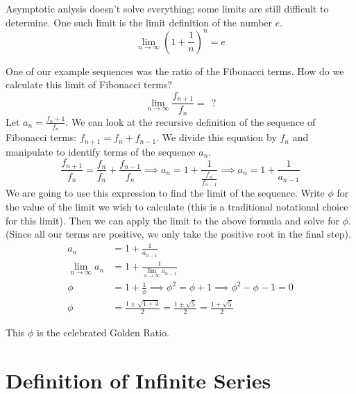 \documentclass[fleqn]{report}
\begin{document}
\begin{example}Asymptotic anlysis doesn't solve everything;
some limits are still difficult to determine. 
One such limit is the limit definition of the number $e$.
\begin{equation*}
\lim_{n \rightarrow \infty} \left( 1 + \frac{1}{n} \right)^n = e 
\end{equation*}
\end{example}

\begin{example}One of our example sequences was the ratio of
the Fibonacci terms. How do we calculate this limit of
Fibonacci terms?
\begin{equation*}
\lim_{n \rightarrow \infty} \frac{f_{n+1}}{f_n} = \ \ ?
\end{equation*}
Let $a_n = \frac{f_n+1}{f_n}$. We can look at the recursive
definition of the sequence of Fibonacci terms: $f_{n+1} = f_{n}
+ f_{n-1}$. We divide this equation by $f_n$ and manipulate to
identify terms of the sequence $a_n$. 
\begin{equation*}
\frac{f_{n+1}}{f_n} = \frac{f_n}{f_n} + \frac{f_{n-1}}{f_n}
\implies 
a_n = 1 + \frac{1}{\frac{f_n}{f_{n-1}}} \implies
a_n = 1 + \frac{1}{a_{n-1}}
\end{equation*}
We are going to use this expression to find the limit of the
sequence. Write $\phi$ for the value of the limit we wish to calculate
(this is a traditional notational choice for this limit). Then
we can apply the limit to the above formula and solve for
$\phi$. (Since all our terms are
positive, we only take the positive root in the final step).
\begin{align*}
a_n & = 1 + \frac{1}{a_{n-1}} \\
\lim_{n \rightarrow \infty} a_n & = 1 + 
\frac{1}{\lim_{n \rightarrow \infty} a_{n-1}} \\
\phi & = 1 + \frac{1}{\phi} \implies 
\phi^2 = \phi + 1 \implies
\phi^2 - \phi - 1 = 0 \\
\phi & = \frac{1 \pm \sqrt{1+4}}{2} = \frac{1 \pm
\sqrt{5}}{2} = \frac{1 + \sqrt{5}}{2}
\end{align*}
\end{example}

This $\phi$ is the celebrated Golden Ratio.

\section{Definition of Infinite Series}
\label{series-definition}
\end{document}
